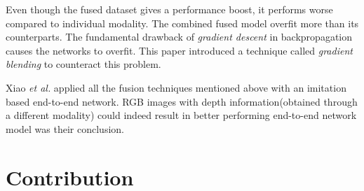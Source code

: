 Even though the fused dataset gives a performance boost, it performs worse  
compared to individual modality. The combined fused model overfit more
than its counterparts. The fundamental drawback of
\textit{gradient descent} in backpropagation causes the networks to overfit. This paper \cite{wang2020makes} introduced a technique
called \textit{gradient blending} to counteract this problem.

Xiao \textit{et al.}\cite{XiaoCodevillaMultimodalE2E} applied all the fusion techniques
mentioned above with an imitation based end-to-end network\cite{codevilla2017endtoend}. RGB images with depth information(obtained through a different modality)
could indeed result in better performing end-to-end network model was their conclusion.


\section{Contribution}




